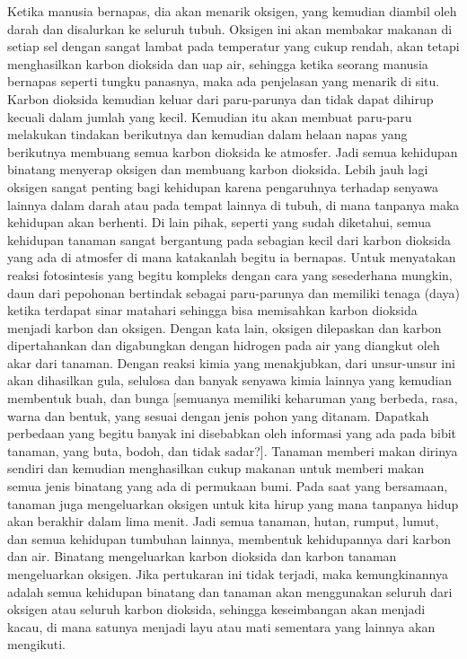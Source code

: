 \documentclass[]{article}
\begin{document}
Ketika manusia bernapas, dia akan menarik oksigen, yang kemudian diambil oleh darah dan disalurkan ke seluruh tubuh. Oksigen ini akan membakar makanan di setiap sel dengan sangat lambat pada temperatur yang cukup rendah, akan tetapi menghasilkan karbon dioksida dan uap air, sehingga ketika seorang manusia bernapas seperti tungku panasnya, maka ada penjelasan yang menarik di situ. Karbon dioksida kemudian keluar dari paru-parunya dan tidak dapat dihirup kecuali dalam jumlah yang kecil. Kemudian itu akan membuat paru-paru melakukan tindakan berikutnya dan kemudian dalam helaan napas yang berikutnya membuang semua karbon dioksida ke atmosfer. Jadi semua kehidupan binatang  menyerap oksigen dan membuang karbon dioksida. Lebih jauh lagi oksigen sangat penting bagi kehidupan karena pengaruhnya terhadap senyawa lainnya  dalam darah atau pada tempat lainnya di tubuh, di mana tanpanya maka kehidupan akan berhenti. 
Di lain pihak, seperti yang sudah diketahui, semua kehidupan tanaman sangat bergantung pada sebagian kecil dari karbon dioksida yang ada di atmosfer di  mana katakanlah begitu ia bernapas. Untuk menyatakan reaksi fotosintesis yang begitu kompleks dengan cara yang sesederhana mungkin, daun dari pepohonan bertindak sebagai paru-parunya dan memiliki tenaga (daya) ketika terdapat sinar matahari sehingga bisa memisahkan karbon dioksida menjadi karbon dan oksigen. Dengan kata lain, oksigen dilepaskan dan karbon dipertahankan dan digabungkan dengan hidrogen pada air yang diangkut oleh akar dari tanaman. Dengan reaksi kimia yang menakjubkan, dari unsur-unsur ini akan dihasilkan gula, selulosa dan banyak senyawa kimia lainnya yang kemudian membentuk buah,  dan bunga  [semuanya memiliki keharuman yang berbeda, rasa, warna dan bentuk, yang sesuai dengan jenis pohon yang ditanam. Dapatkah perbedaan yang begitu banyak ini disebabkan oleh informasi yang ada pada bibit tanaman, yang buta, bodoh, dan tidak sadar?].  Tanaman memberi makan dirinya sendiri dan kemudian menghasilkan cukup makanan untuk memberi makan semua jenis binatang yang ada di permukaan bumi. Pada saat yang bersamaan,  tanaman juga mengeluarkan oksigen untuk kita hirup yang mana tanpanya hidup akan berakhir dalam lima menit. Jadi semua tanaman, hutan, rumput, lumut, dan semua kehidupan tumbuhan lainnya, membentuk kehidupannya dari karbon dan air. Binatang mengeluarkan karbon dioksida dan karbon tanaman mengeluarkan oksigen. Jika pertukaran ini tidak terjadi, maka kemungkinannya adalah semua kehidupan binatang dan tanaman akan menggunakan seluruh dari oksigen atau seluruh karbon dioksida, sehingga keseimbangan akan menjadi kacau, di mana satunya menjadi layu atau mati sementara yang lainnya akan mengikuti. 
\end{document}
